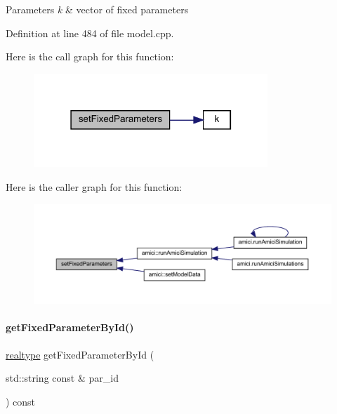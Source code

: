 \begin{DoxyParams}{Parameters}
{\em k} & vector of fixed parameters \\
\hline
\end{DoxyParams}


Definition at line 484 of file model.\+cpp.

Here is the call graph for this function\+:
\nopagebreak
\begin{figure}[H]
\begin{center}
\leavevmode
\includegraphics[width=250pt]{classamici_1_1_model_a14ba63ae81b4e8fa1f46884b703e2c30_cgraph}
\end{center}
\end{figure}
Here is the caller graph for this function\+:
\nopagebreak
\begin{figure}[H]
\begin{center}
\leavevmode
\includegraphics[width=350pt]{classamici_1_1_model_a14ba63ae81b4e8fa1f46884b703e2c30_icgraph}
\end{center}
\end{figure}
\mbox{\label{classamici_1_1_model_acc647ebbeaf0be737c7c165fa77eeca5}} 
\paragraph{\texorpdfstring{get\+Fixed\+Parameter\+By\+Id()}{getFixedParameterById()}}
{\footnotesize\ttfamily \mbox{\hyperlink{namespaceamici_a1bdce28051d6a53868f7ccbf5f2c14a3}{realtype}} get\+Fixed\+Parameter\+By\+Id (\begin{DoxyParamCaption}\item[{std\+::string const \&}]{par\+\_\+id }\end{DoxyParamCaption}) const}


